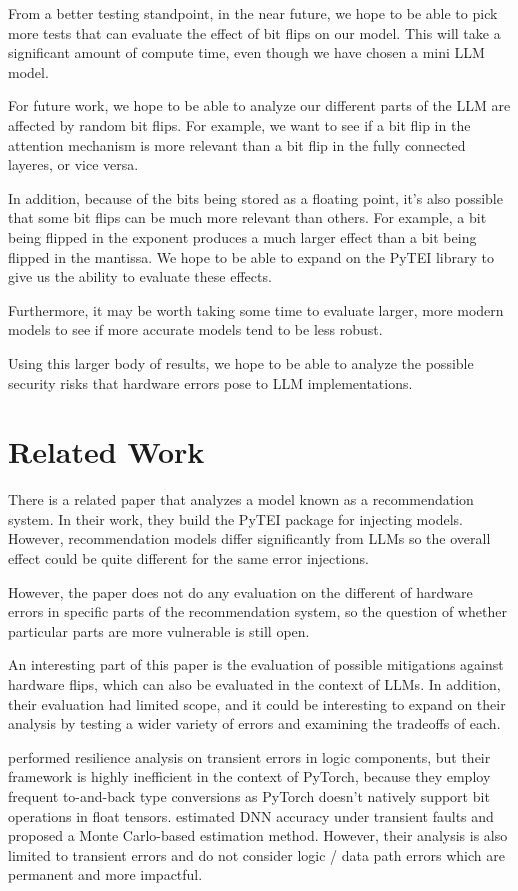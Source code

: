\documentclass[a4paper]{article}
\begin{document}
From a better testing standpoint, in the near future, we hope to be able to pick more tests that can evaluate the effect of bit flips on our model. This will take a significant amount of compute time, even though we have chosen a mini LLM model.

For future work, we hope to be able to analyze our different parts of the LLM are affected by random bit flips. For example, we want to see if a bit flip in the attention mechanism is more relevant than a bit flip in the fully connected layeres, or vice versa. 

In addition, because of the bits being stored as a floating point, it's also possible that some bit flips can be much more relevant than others. For example, a bit being flipped in the exponent produces a much larger effect than a bit being flipped in the mantissa. We hope to be able to expand on the PyTEI library to give us the ability to evaluate these effects.

Furthermore, it may be worth taking some time to evaluate larger, more modern models to see if more accurate models tend to be less robust.

Using this larger body of results, we hope to be able to analyze the possible security risks that hardware errors pose to LLM implementations.

\section{Related Work}
There is a related paper \cite{Ma23} that analyzes a model known as a recommendation system. In their work, they build the PyTEI package for injecting models. However, recommendation models differ significantly from LLMs so the overall effect could be quite different for the same error injections.

However, the paper does not do any evaluation on the different of hardware errors in specific parts of the recommendation system, so the question of whether particular parts are more vulnerable is still open.

An interesting part of this paper is the evaluation of possible mitigations against hardware flips, which can also be evaluated in the context of LLMs. In addition, their evaluation had limited scope, and it could be interesting to expand on their analysis by testing a wider variety of errors and examining the tradeoffs of each.

\cite{fidelity} performed resilience analysis on transient errors in logic components, but their framework is highly inefficient in the context of PyTorch, because they employ frequent to-and-back type conversions as PyTorch doesn't natively support bit operations in float tensors. \cite{thales} estimated DNN accuracy under transient faults and proposed a Monte Carlo-based estimation method. However, their analysis is also limited to transient errors and do not consider logic / data path errors which are permanent and more impactful.
\end{document}
